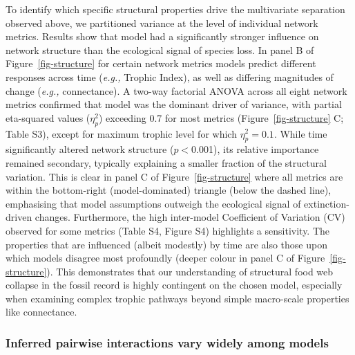 \documentclass[
]{article}
\begin{document}
To identify which specific structural properties drive the multivariate
separation observed above, we partitioned variance at the level of
individual network metrics. Results show that model had a significantly
stronger influence on network structure than the ecological signal of
species loss. In panel B of Figure~\ref{fig-structure} for certain
network metrics models predict different responses across time
(\emph{e.g.,} Trophic Index), as well as differing magnitudes of change
(\emph{e.g.,} connectance). A two-way factorial ANOVA across all eight
network metrics confirmed that model was the dominant driver of
variance, with partial eta-squared values (\(\eta^{2}_{p}\)) exceeding
0.7 for most metrics (Figure~\ref{fig-structure} C; Table S3), except
for maximum trophic level for which \(\eta^{2}_{p} = 0.1\). While time
significantly altered network structure (\(p<0\).001), its relative
importance remained secondary, typically explaining a smaller fraction
of the structural variation. This is clear in panel C of
Figure~\ref{fig-structure} where all metrics are within the bottom-right
(model-dominated) triangle (below the dashed line), emphasising that
model assumptions outweigh the ecological signal of extinction-driven
changes. Furthermore, the high inter-model Coefficient of Variation (CV)
observed for some metrics (Table S4, Figure S4) highlights a
sensitivity. The properties that are influenced (albeit modestly) by
time are also those upon which models disagree most profoundly (deeper
colour in panel C of Figure~\ref{fig-structure}). This demonstrates that
our understanding of structural food web collapse in the fossil record
is highly contingent on the chosen model, especially when examining
complex trophic pathways beyond simple macro-scale properties like
connectance.

\subsubsection{Inferred pairwise interactions vary widely among
models}\label{inferred-pairwise-interactions-vary-widely-among-models}
\end{document}
